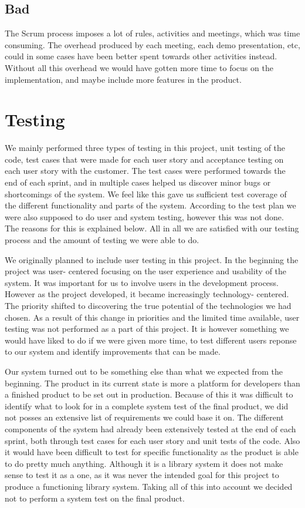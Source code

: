 \subsection*{Bad}
The Scrum process imposes a lot of rules, activities and meetings, which was time consuming. The overhead produced by each meeting, each demo presentation, etc, could in some cases have been better spent towards other activities instead. Without all this overhead we would have gotten more time to focus on the implementation, and maybe include more features in the product.


\section{Testing}
We mainly performed three types of testing in this project, unit testing of the code, test cases that were made for each user story and acceptance testing on each user story with the customer. The test cases were performed towards the end of each sprint, and in multiple cases helped us discover minor bugs or shortcomings of the system. We feel like this gave us sufficient test coverage of the different functionality and parts of the system. According to the test plan we were also supposed to do user and system testing, however this was not done. The reasons for this is explained below. All in all we are satisfied with our testing process and the amount of testing we were able to do.

We originally planned to include user testing in this project. In the beginning the project was user- centered focusing on the user experience and usability of the system. It was important for us to involve users in the development process. However as the project developed, it became increasingly technology- centered. The priority shifted to discovering the true potential of the technologies we had chosen. As a result of this change in priorities and the limited time available, user testing was not performed as a part of this project. It is however something we would have liked to do if we were given more time, to test different users reponse to our system and identify improvements that can be made.

Our system turned out to be something else than what we expected from the beginning. The product in its current state is more a platform for developers than a finished product to be set out in production. Because of this it was difficult to identify what to look for in a complete system test of the final product, we did not posses an extensive list of requirements we could base it on. The different components of the system had already been extensively tested at the end of each sprint, both through test cases for each user story and unit tests of the code. Also it would have been difficult to test for specific functionality as the product is able to do pretty much anything. Although it is a library system it does not make sense to test it as a one, as it was never the intended goal for this project to produce a functioning library system. Taking all of this into account we decided not to perform a system test on the final product.


